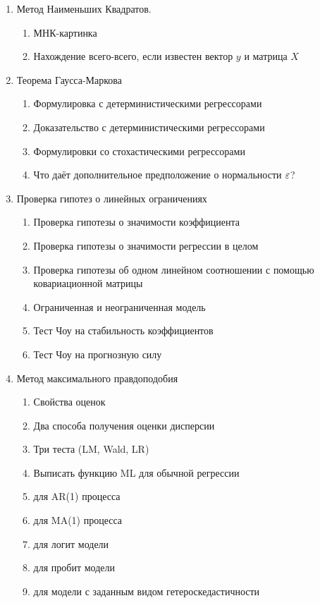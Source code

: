 \documentclass[12pt, a4paper]{article}
\theoremstyle{definition}
\begin{document}
\begin{enumerate}

\item Метод Наименьших Квадратов.

\begin{enumerate}
\item МНК-картинка
\item Нахождение всего-всего, если известен вектор $y$ и матрица $X$
  \end{enumerate}

\item Теорема Гаусса-Маркова
\begin{enumerate}
\item Формулировка с детерминистическими регрессорами
\item Доказательство с детерминистическими регрессорами
\item Формулировки со стохастическими регрессорами
\item Что даёт дополнительное предположение о нормальности $\varepsilon$?
\end{enumerate}

\item Проверка гипотез о линейных ограничениях
\begin{enumerate}
\item Проверка гипотезы о значимости коэффициента
\item Проверка гипотезы о значимости регрессии в целом
\item Проверка гипотезы об одном линейном соотношении с помощью ковариационной матрицы
\item Ограниченная и неограниченная модель
\item Тест Чоу на стабильность коэффициентов
\item Тест Чоу на прогнозную силу
\end{enumerate}

\item Метод максимального правдоподобия

\begin{enumerate}
\item Свойства оценок
\item Два способа получения оценки дисперсии
\item Три теста (LM, Wald, LR)
\item Выписать функцию ML для обычной регрессии
\item для AR(1) процесса
\item для MA(1) процесса
\item для логит модели
\item для пробит модели
\item для модели с заданным видом гетероскедастичности
\end{enumerate}


\end{enumerate}
\end{document}
